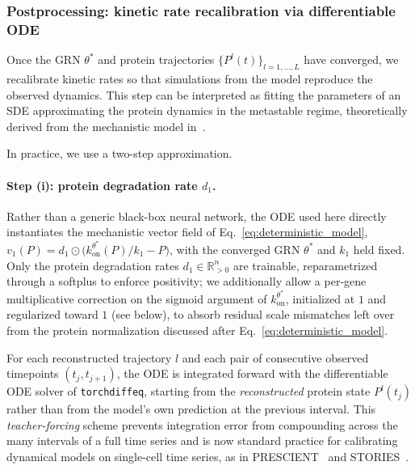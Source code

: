 \documentclass[a4paper, 11pt]{article}
\theoremstyle{plain}
\theoremstyle{remark}
\newcommand*{\firstreview}[1]{{\color{black}#1}}
\begin{document}
\subsubsection{Postprocessing: kinetic rate recalibration via differentiable ODE}
\label{subsec:postproc}

Once the GRN $\theta^*$ and protein trajectories $\{P^l(t)\}_{l=1,\dots,L}$ have converged, we recalibrate kinetic rates so that simulations from the model reproduce the observed dynamics. This step can be interpreted as fitting the parameters of an SDE approximating the protein dynamics in the metastable regime, theoretically derived from the mechanistic model in~\cite{ventre2020reduction}.

In practice, we use a two-step approximation.

\paragraph{Step (i): protein degradation rate $d_1$.}
\firstreview{Rather than a generic black-box neural network, the ODE used here directly instantiates the mechanistic vector field of Eq.~\eqref{eq:deterministic_model}, $v_1(P)=d_1\odot\big(k_{\mathrm{on}}^{\theta^*}(P)/k_1-P\big)$, with the converged GRN $\theta^*$ and $k_1$ held fixed. Only the protein degradation rates $d_1\in\mathbb{R}^n_{>0}$ are trainable, reparametrized through a softplus to enforce positivity; we additionally allow a per-gene multiplicative correction on the sigmoid argument of $k_{\mathrm{on}}^{\theta^*}$, initialized at $1$ and regularized toward $1$ (see below), to absorb residual scale mismatches left over from the protein normalization discussed after Eq.~\eqref{eq:deterministic_model}.}

\firstreview{For each reconstructed trajectory $l$ and each pair of consecutive observed timepoints $(t_j,t_{j+1})$, the ODE is integrated forward with the differentiable ODE solver of \texttt{torchdiffeq}, starting from the \emph{reconstructed} protein state $P^l(t_j)$ rather than from the model's own prediction at the previous interval. This \emph{teacher-forcing} scheme prevents integration error from compounding across the many intervals of a full time series and is now standard practice for calibrating dynamical models on single-cell time series, as in PRESCIENT~\cite{yeo2021generative} and STORIES~\cite{huizing2025stories}.}
\end{document}
